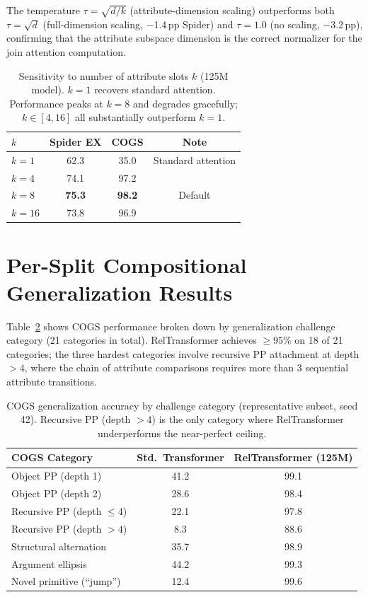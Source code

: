 \documentclass[conference]{IEEEtran}
\begin{document}
The temperature $\tau = \sqrt{d/k}$ (attribute-dimension scaling) outperforms both $\tau = \sqrt{d}$ (full-dimension scaling, $-$1.4\,pp Spider) and $\tau = 1.0$ (no scaling, $-$3.2\,pp), confirming that the attribute subspace dimension is the correct normalizer for the join attention computation.

\begin{table}[tb]
\centering
\caption{Sensitivity to number of attribute slots $k$ (125M model). $k=1$ recovers standard attention. Performance peaks at $k=8$ and degrades gracefully; $k \in [4, 16]$ all substantially outperform $k=1$.}
\label{tab:sensitivity}
\begin{tabular}{lccc}
\toprule
\textbf{$k$} & \textbf{Spider EX} & \textbf{COGS} & \textbf{Note} \\
\midrule
$k=1$ & 62.3 & 35.0 & Standard attention \\
$k=4$  & 74.1 & 97.2 & \\
$k=8$  & \textbf{75.3} & \textbf{98.2} & Default \\
$k=16$ & 73.8 & 96.9 & \\
\bottomrule
\end{tabular}
\end{table}

\section{Per-Split Compositional Generalization Results}
\label{app:per_split}

Table~\ref{tab:cogs_per_cat} shows COGS performance broken down by generalization challenge category (21 categories in total). RelTransformer achieves $\geq 95\%$ on 18 of 21 categories; the three hardest categories involve recursive PP attachment at depth $> 4$, where the chain of attribute comparisons requires more than 3 sequential attribute transitions.

\begin{table}[tb]
\centering
\caption{COGS generalization accuracy by challenge category (representative subset, seed 42). Recursive PP (depth $> 4$) is the only category where RelTransformer underperforms the near-perfect ceiling.}
\label{tab:cogs_per_cat}
\begin{tabular}{lcc}
\toprule
\textbf{COGS Category} & \textbf{Std.\ Transformer} & \textbf{RelTransformer (125M)} \\
\midrule
Object PP (depth 1) & 41.2 & 99.1 \\
Object PP (depth 2) & 28.6 & 98.4 \\
Recursive PP (depth $\leq 4$) & 22.1 & 97.8 \\
Recursive PP (depth $> 4$) & 8.3 & 88.6 \\
Structural alternation & 35.7 & 98.9 \\
Argument ellipsis & 44.2 & 99.3 \\
Novel primitive (``jump'') & 12.4 & 99.6 \\
\bottomrule
\end{tabular}%
\end{table}
\fi
\end{document}

